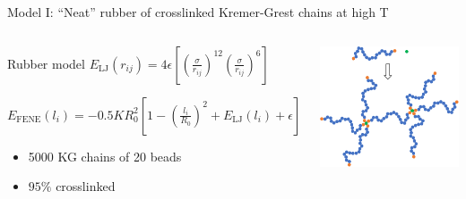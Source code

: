 \documentclass[aspectratio=169,xcolor=table]{beamer}
\begin{document}
\begin{frame}[c]{Model I: ``Neat'' rubber of crosslinked Kremer-Grest chains at high T}

  \centering
  \begin{columns}[c]


    \begin{block}{Rubber model}
    $E_{\mathrm{LJ}}(r_{ij}) = 4 \epsilon \left[ \left( \frac{\sigma}{r_{ij}} \right)^{12} \left( \frac{\sigma}{r_{ij}} \right)^{6} \right]$
    \vspace{0.5\baselineskip}

    $E_{\mathrm{FENE}}(l_{i}) = -0.5 K R_{0}^{2} \left[ 1 - \left( \frac{l_{i}}{R_{0}} \right)^{2} + E_{\mathrm{LJ}}(l_{i}) + \epsilon \right]$
    \vspace{0.5\baselineskip}

    \begin{itemize}
      \item 5000 KG chains of 20 beads
      \item $95\%$ crosslinked
    \end{itemize}
    \end{block}


    \centering
    \includegraphics[width=\textwidth]{figs/CrosslinkingScheme.png}

  \end{columns}

\end{frame}
\end{document}
